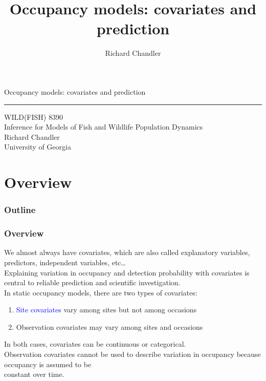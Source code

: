 \documentclass[color=usenames,dvipsnames]{beamer}\usepackage[]{graphicx}\usepackage[]{xcolor}
\title{Occupancy models: covariates and prediction }
\author{Richard Chandler}
\begin{document}
\begin{frame}[plain]
  \LARGE
  \centering
  {\huge Occupancy models: covariates and prediction} \\
  {\color{default} \rule{\textwidth}{0.1pt}}
  \vfill
  \large
  WILD(FISH) 8390 \\
   Inference for Models of Fish and Wildlife Population Dynamics \\
  \vfill
  \large
  Richard Chandler \\
  University of Georgia \\
\end{frame}






\section{Overview}



\begin{frame}[plain]
  \frametitle{Outline}
  \Large
\end{frame}



\begin{frame}
  \frametitle{Overview}
  We almost always have covariates, which are also called explanatory
  variables, predictors, independent variables, etc\dots \\
  \pause
  \vfill
  Explaining variation in occupancy and detection probability with
  covariates is central to reliable prediction and scientific
  investigation. \\  
  \pause
  \vfill
  In static occupancy models, there are two types of covariates:
  \begin{enumerate}
    \item \textcolor{blue}{Site covariates} vary among sites
      but not among occasions
    \item \textcolor{Bittersweet}{Observation covariates} may vary among
      sites and occasions
  \end{enumerate}
  \pause
  \vfill
  In both cases, covariates can be continuous or categorical. \\
  \pause
  \vfill
  \centering
  {Observation covariates cannot be used to describe variation
    in occupancy because occupancy is assumed to be \\ constant over
    time.} \\ 
\end{frame}
\end{document}
